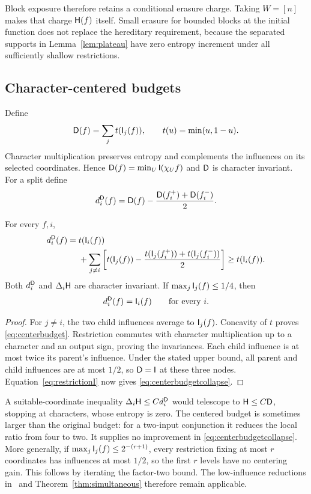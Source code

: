 Block exposure therefore retains a conditional erasure charge.
Taking $W=[n]$ makes that charge $\mathsf H(f)$ itself. Small erasure
for bounded blocks at the initial function does not replace the
hereditary requirement, because the separated supports in
Lemma~\ref{lem:plateau} have zero entropy increment under all
sufficiently shallow restrictions.

\subsection{Character-centered budgets}

Define
\[
 \mathsf D(f)=\sum_j t(\mathsf I_j(f)),\qquad t(u)=\min(u,1-u).
\]
Character multiplication preserves entropy and complements the
influences on its selected coordinates. Hence
$\mathsf D(f)=\min_U\mathsf I(\chi_Uf)$ and $\mathsf D$ is character invariant.
For a split define
\[
 d_i^{\mathsf D}(f)=\mathsf D(f)
            -\frac{\mathsf D(f_i^+)+\mathsf D(f_i^-)}2.
\]

\begin{proposition}\label{prop:centerbudget}
For every $f,i$,
\begin{align}
 d_i^{\mathsf D}(f)
 ={}&t(\mathsf I_i(f))\notag\\
 &+\sum_{j\ne i}
 \left[t(\mathsf I_j(f))
       -\frac{t(\mathsf I_j(f_i^+))+t(\mathsf I_j(f_i^-))}2\right]
 \ge t(\mathsf I_i(f)).\label{eq:centerbudget}
\end{align}
Both $d_i^{\mathsf D}$ and $\Delta_i\mathsf H$ are character invariant.
If $\max_j\mathsf I_j(f)\le1/4$, then
\begin{equation}\label{eq:centerbudgetcollapse}
 d_i^{\mathsf D}(f)=\mathsf I_i(f)\qquad\text{for every }i.
\end{equation}
\end{proposition}

\begin{proof}
For $j\ne i$, the two child influences average to $\mathsf I_j(f)$.
Concavity of $t$ proves \eqref{eq:centerbudget}.
Restriction commutes with character multiplication up to a
character and an output sign, proving the invariances.
Each child influence is at most twice its parent's influence.
Under the stated upper bound, all parent and child influences
are at most $1/2$, so $\mathsf D=\mathsf I$ at these three nodes.
Equation~\eqref{eq:restrictionI} now gives
\eqref{eq:centerbudgetcollapse}.
\end{proof}

A suitable-coordinate inequality
$\Delta_i\mathsf H\le C d_i^{\mathsf D}$ would telescope to
$\mathsf H\le C\mathsf D$, stopping at characters, whose entropy is zero.
The centered budget is sometimes larger than the original
budget: for a two-input conjunction it reduces the local ratio
from four to two. It supplies no improvement in
\eqref{eq:centerbudgetcollapse}. More generally, if
$\max_j\mathsf I_j(f)\le2^{-(r+1)}$, every restriction fixing at most
$r$ coordinates has influences at most $1/2$, so the first
$r$ levels have no centering gain. This follows by iterating
the factor-two bound. The low-influence reductions
in~\cite{BrainCritical} and Theorem~\ref{thm:simultaneous}
therefore remain applicable.

